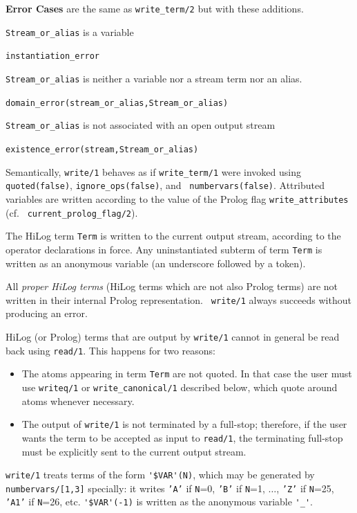\begin{description}
{\bf Error Cases} are the same as {\tt write\_term/2} but with these
additions.
\bi
\item 	{\tt Stream\_or\_alias} is a variable
\bi
\item {\tt instantiation\_error}
\ei
\item 	{\tt Stream\_or\_alias} is neither a variable nor a stream term nor an alias.
\bi
\item 	{\tt domain\_error(stream\_or\_alias,Stream\_or\_alias)}
\ei
\item 	{\tt Stream\_or\_alias} is not associated with an open output stream
\bi
\item 	{\tt existence\_error(stream,Stream\_or\_alias)}
\ei
\ei

% 
Semantically, {\tt write/1} behaves as if {\tt write\_term/1} were
invoked using {\tt quoted(false)}, {\tt ignore\_ops(false)}, and {\tt
  numbervars(false)}.  Attributed variables are written according to
the value of the Prolog flag {\tt write\_attributes} (cf. {\tt
  current\_prolog\_flag/2}).

The HiLog term {\tt Term} is written to the current output stream,
according to the operator declarations in force.  Any uninstantiated
subterm of term {\tt Term} is written as an anonymous variable (an
underscore followed by a token).  

All {\em proper HiLog terms} (HiLog terms which are not also Prolog
terms) are not written in their internal Prolog representation.  {\tt
  write/1} always succeeds without producing an error.

HiLog (or Prolog) terms that are output by {\tt write/1} cannot in
general be read back using {\tt read/1}.  This happens for two
reasons:
    \begin{itemize}
    \item The atoms appearing in term {\tt Term} are not quoted. In that case 
          the user must use {\tt writeq/1} or 
          {\tt write\_canonical/1} described below, which quote around atoms 
          whenever necessary.
    \item The output of {\tt write/1} is not terminated by a full-stop;
          therefore, if the user wants the term to be accepted as input to
          {\tt read/1}, the terminating full-stop must be explicitly sent 
          to the current output stream. 
    \end{itemize}

{\tt write/1} treats terms of the form \verb|'$VAR'(N)|, which may be
generated by {\tt numbervars/[1,3]} specially: it writes {\tt 'A'} if
{\tt N}=0, {\tt 'B'} if {\tt N}=1, $\ldots$, {\tt 'Z'} if {\tt N}=25,
{\tt 'A1'} if {\tt N}=26, etc.  \verb|'$VAR'(-1)| is written as the
anonymous variable \verb|'_'|.


\end{description}
